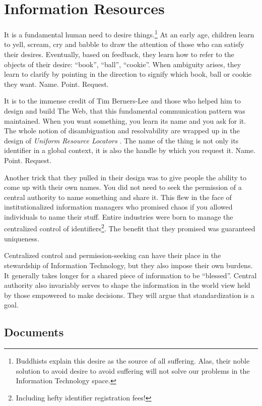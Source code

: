 \chapter{Information Resources}
\label{chap:InformationResources}

It is a fundamental human need to desire things.\footnote{Buddhists explain this desire as the source of all suffering. Alas, their noble solution to avoid desire to avoid suffering will not solve our problems in the Information Technology space.} At an early age, children learn to yell, scream, cry and babble to draw the attention of those who can satisfy their desires. Eventually, based on feedback, they learn how to refer to the objects of their desire: ``book'', ``ball'', ``cookie''. When ambiguity arises, they learn to clarify by pointing in the direction to signify which book, ball or cookie they want. Name. Point. Request.

It is to the immense credit of Tim Berners-Lee and those who helped him to design and build The Web, that this fundamental communication pattern was maintained. When you want something, you learn its name and you ask for it. The whole notion of disambiguation and resolvability are wrapped up in the design of \emph{Uniform Resource Locators} \citep{rfc1738}. The name of the thing is not only its identifier in a global context, it is also the handle by which you request it. Name. Point. Request.

Another trick that they pulled in their design was to give people the ability to come up with their own names. You did not need to seek the permission of a central authority to name something and share it. This flew in the face of institutionalized information managers who promised chaos if you allowed individuals to name their stuff. Entire industries were born to manage the centralized control of identifiers\footnote{Including hefty identifier registration fees!}. The benefit that they promised was guaranteed uniqueness.

Centralized control and permission-seeking can have their place in the stewardship of Information Technology, but they also impose their own burdens. It generally takes longer for a shared piece of information to be ``blessed''. Central authority also invariably serves to shape the information in the world view held by those empowered to make decisions. They will argue that standardization is a goal.

\section{Documents}


